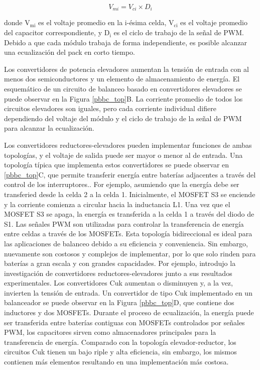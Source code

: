 \documentclass[10pt,a4paper]{article}
\begin{document}
\begin{equation}
    V_{mi} = V_{ci} \times D_i \label{pbbc_reduc_voltaje}
\end{equation}

donde $\mathrm{V_{mi}}$ es el voltaje promedio en la i-\'esima celda,
$\mathrm{V_{ci}}$ es el voltaje promedio del capacitor correspondiente, y
$\mathrm{D_i}$ es el ciclo de trabajo de la señal de \acrshort{PWM}. Debido a
que cada m\'odulo trabaja de forma independiente, es posible alcanzar una
ecualizaci\'on del pack en corto tiempo.

Los convertidores de potencia elevadores aumentan la tensi\'on de entrada con
al menos dos semiconductores y un elemento de almacenamiento de energ\'ia. El
esquem\'atico de un circuito de balanceo basado en convertidores elevadores se
puede observar en la Figura \ref{pbbc_top}B. La corriente promedio de todos los
circuitos elevadores son iguales, pero cada corriente individual difiere
dependiendo del voltaje del m\'odulo y el ciclo de trabajo de la señal de
\acrshort{PWM} para alcanzar la ecualizaci\'on.

Los convertidores reductores-elevadores pueden implementar funciones de ambas
topolog\'ias, y el voltaje de salida puede ser mayor o menor al de entrada. Una
topolog\'ia t\'ipica que implementa estos convertidores se puede observar en
\ref{pbbc_top}C, que permite transferir energ\'ia entre bater\'ias adjacentes a
trav\'es del control de los interruptores.. For ejemplo, asumiendo que la
energ\'ia debe ser transferied desde la celda 2 a la celda 1. Inicialmente, el
MOSFET S3 se enciende y la corriente comienza a circular hacia la inductancia
L1. Una vez que el MOSFET S3 se apaga, la energ\'ia es transferida a la celda 1
a trav\'es del diodo de S1. Las señales \acrshort{PWM} son utilizadas para
controlar la transferencia de energ\'ia entre celdas a trav\'es de los MOSFETs.
Esta topolog\'ia bidireccional es ideal para las aplicaciones de balanceo debido
a su eficiencia y conveniencia. Sin embargo, nuevamente son costosos y complejos
de implementar, por lo que solo rinden para bater\'ias a gran escala y con
grandes capacidades. Por ejemplo, \cite{shang_et_al_bal_rect} introdujo la 
investigaci\'on de convertidores reductores-elevadores junto a sus resultados 
experimentales.
\newpage
Los convertidores Cuk aumentan o disminuyen y, a la vez, invierten la tensi\'on
de entrada. Un convertidor de tipo Cuk implementado en un balanceador se puede
observar en la Figura \ref{pbbc_top}D, que contiene dos inductores y dos
MOSFETs. Durante el proceso de ecualizaci\'on, la energ\'ia puede ser
transferida entre bater\'ias contiguas con MOSFETs controlados por señales
\acrshort{PWM}, los capacitores sirven como almacenadores principales para la
transferencia de energ\'ia. Comparado con la topolog\'ia elevador-reductor, los
circuitos Cuk tienen un bajo riple y alta eficiencia, sin embargo, los mismos
contienen m\'as elementos resultando en una implementaci\'on m\'as costosa.
\end{document}
